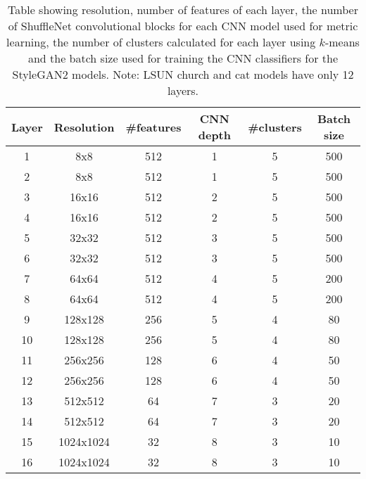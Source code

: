 \begin{table}[]
\centering
\begin{tabular}{|c|c|c|c|c|c|}%
\hline
Layer & Resolution & \#features &  CNN depth & \#clusters & Batch size\\
\hline
1     & 8x8        & 512          & 1                & 5                & 500        \\
2     & 8x8        & 512          & 1                & 5                & 500        \\
3     & 16x16      & 512          & 2                & 5                & 500        \\
4     & 16x16      & 512          & 2                & 5                & 500        \\
5     & 32x32      & 512          & 3                & 5                & 500        \\
6     & 32x32      & 512          & 3                & 5                & 500        \\
7     & 64x64      & 512          & 4                & 5                & 200        \\
8     & 64x64      & 512          & 4                & 5                & 200         \\
9     & 128x128    & 256          & 5                & 4                & 80         \\
10    & 128x128    & 256          & 5                & 4                & 80         \\
11    & 256x256    & 128          & 6                & 4                & 50         \\
12    & 256x256    & 128          & 6                & 4                & 50         \\
13    & 512x512    & 64           & 7                & 3                & 20         \\
14    & 512x512    & 64           & 7                & 3                & 20         \\
15    & 1024x1024  & 32           & 8                & 3                & 10         \\
16    & 1024x1024  & 32           & 8                & 3                & 10       \\
\hline
\end{tabular}
\medskip
\caption[Table detailing model architecture for the ShuffleNet models used for clustering in StyleGAN2.]{
    \label{tab:classifier-table}Table showing resolution, number of features of each layer, the number of ShuffleNet \citep{zhang2018shufflenet} convolutional blocks for each CNN model used for metric learning, the number of clusters calculated for each layer using $k$-means and the batch size used for training the CNN classifiers for the StyleGAN2 models. Note: LSUN church and cat models have only 12 layers.
}
\end{table}

